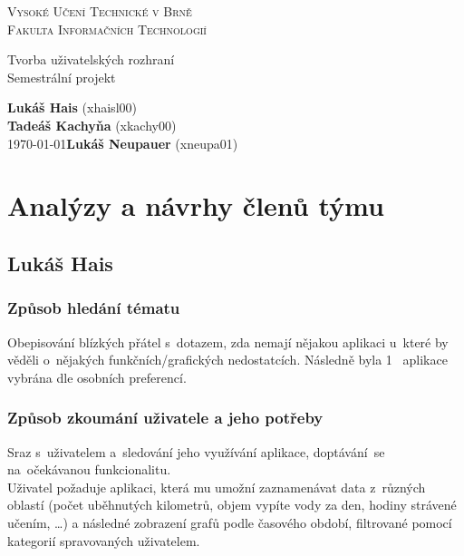 \documentclass[12pt, titlepage]{article}
\begin{document}
\begin{titlepage}
    \begin{center}
        \textsc{\Huge{Vysoké Učení Technické v Brně\\[0.3em]}}
        \textsc{\huge{Fakulta Informačních Technologií}}
        
        
        \LARGE{Tvorba uživatelských rozhraní\\}
        \Huge{Semestrální projekt}
        
    \end{center}
    {\Large \phantom{} \hfill \textbf{Lukáš Hais} (xhaisl00)\\
		\phantom{} \hfill \textbf{Tadeáš Kachyňa} (xkachy00)\\
		\today \hfill \textbf{Lukáš Neupauer} (xneupa01)}
\end{titlepage}

\tableofcontents
\newpage

\section{Analýzy a návrhy členů týmu}

\subsection{Lukáš Hais}
\subsubsection{Způsob hledání tématu}
Obepisování blízkých přátel s~dotazem, zda nemají nějakou aplikaci u~které by věděli o~nějakých funkčních/grafických nedostatcích. Následně byla 1~
aplikace vybrána dle osobních preferencí.
\subsubsection{Způsob zkoumání uživatele a jeho potřeby}
Sraz s~uživatelem a~sledování jeho využívání aplikace, doptávání~se na~očekávanou funkcionalitu.\\
Uživatel požaduje aplikaci, která mu umožní zaznamenávat data z~různých oblastí (počet uběhnutých kilometrů, objem vypíte vody za den, hodiny strávené učením,  \ldots) a následné zobrazení grafů podle časového období, filtrované pomocí kategorií spravovaných uživatelem.
\end{document}
